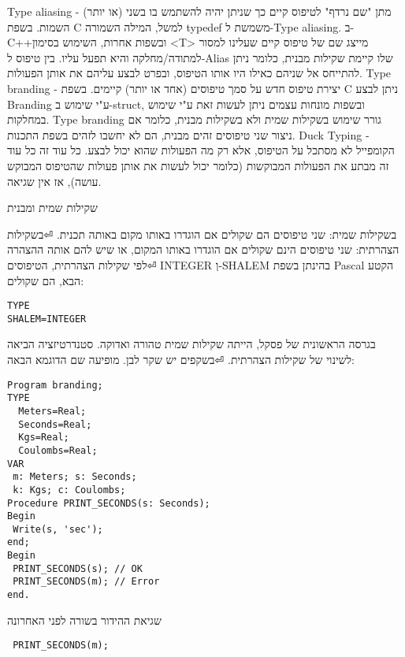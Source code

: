       Type aliasing - מתן "שם נרדף" לטיפוס קיים כך שניתן יהיה להשתמש בו בשני (או יותר) השמות. בשפת C למשל, המילה השמורה typedef משמשת ל-Type aliasing. ב-C++ובשפות אחרות, השימוש בסימון <T> מייצג שם של טיפוס קיים שעלינו למסור למתודה/מחלקה והיא תפעל עליו. בין טיפוס ל-Alias שלו קיימת שקילות מבנית, כלומר ניתן להתייחס אל שניהם כאילו היו אותו הטיפוס, ובפרט לבצע עליהם את אותן הפעולות.
      Type branding - יצירת טיפוס חדש על סמך טיפוסים (אחד או יותר) קיימים. בשפת C ניתן לבצע Branding ע"י שימוש ב-struct, ובשפות מונחות עצמים ניתן לעשות זאת ע"י שימוש במחלקות. Type branding גורר שימוש בשקילות שמית ולא בשקילות מבנית, כלומר אם ניצור שני טיפוסים זהים מבנית, הם לא יחשבו לזהים בשפת התכנות.
      Duck Typing - הקומפייל לא מסתכל על הטיפוס, אלא רק מה הפעולות שהוא יכול לבצע. כל עוד זה כל עוד זה מבתע את הפעולות המבוקשות (כלומר יכול לעשות את אותן פעולות שהטיפוס המבוקש עושה), אז אין שגיאה.

      שקילות שמית ומבנית
      \begin{ציינון}
\item בשקילות שמית: שני טיפוסים הם שקולים אם הוגדרו באותו מקום באותה תכנית.
⏎בשקילות הצהרתית: שני טיפוסים הינם שקולים אם הוגדרו באותו המקום, או שיש להם אותה ההצהרה
⏎לפי שקילות הצהרתית, הטיפוסים INTEGER וְ-SHALEM בהינתן בשפת Pascal הקטע הבא, הם שקולים:
    \end{ציינון}

\begin{verbatim}
TYPE
SHALEM=INTEGER
\end{verbatim}
      \begin{ציינון}
\item בגרסה הראשונית של פסקל, הייתה שקילות שמית טהורה ואדוקה. סטנדרטיזציה הביאה לשינוי של שקילות הצהרתית.
⏎בשקפים יש שקר לבן. מופיעה שם הדוגמא הבאה:
    \end{ציינון}

\begin{verbatim}
Program branding;
TYPE
  Meters=Real;
  Seconds=Real;
  Kgs=Real;
  Coulombs=Real;
VAR
 m: Meters; s: Seconds;
 k: Kgs; c: Coulombs;
Procedure PRINT_SECONDS(s: Seconds);
Begin
 Write(s, 'sec');
end;
Begin
 PRINT_SECONDS(s); // OK
 PRINT_SECONDS(m); // Error
end.
\end{verbatim}

      \begin{ציינון}
\item שגיאת ההידור בשורה לפני האחרונה
    \end{ציינון}

\begin{verbatim}
 PRINT_SECONDS(m);
\end{verbatim}

